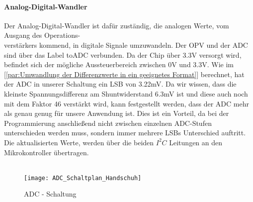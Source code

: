 \documentclass[titlepage,12pt,twoside]{article}
\begin{document}
\paragraph{Analog-Digital-Wandler}
\hfill \break
\hfill \break
Der Analog-Digital-Wandler ist dafür zuständig, die analogen Werte, vom Ausgang des Operations-\\verstärkers kommend, in digitale 
Signale umzuwandeln. Der OPV und der ADC sind über das Label toADC verbunden. Da der Chip über 3.3V versorgt wird, befindet
sich der mögliche Aussteuerbereich zwischen 0V und 3.3V. Wie im [\textcolor{blue}{\autoref{par:Umwandlung der Differenzwerte in ein geeignetes Format}}] berechnet, 
hat der ADC in unserer Schaltung ein LSB von 3.22mV. Da wir wissen, dass die kleinste Spannungsdifferenz am Shuntwiderstand 6.3mV
ist und diese auch noch mit dem Faktor 46 verstärkt wird, kann festgestellt werden, dass der ADC mehr als genau genug für unsere
Anwendung ist. Dies ist ein Vorteil, da bei der Programmierung anschließend nicht zwischen einzelnen ADC-Stufen unterschieden werden
muss, sondern immer mehrere LSBs Unterschied auftritt. Die aktualisierten Werte, werden über die beiden $I^{2}C$ Leitungen an den 
Mikrokontroller übertragen. \\
\\
\begin{figure}[H]
	\begin{center}
		\scalebox{0.5}
		{\texttt{[image: ADC\_Schaltplan\_Handschuh]}}
		\caption{ADC - Schaltung}
		\label{fig:ADC_Schaltplan_Handschuh}	
	\end{center}
\end{figure}
\end{document}
